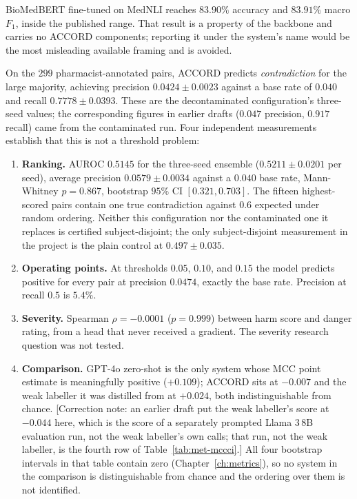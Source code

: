 BioMedBERT fine-tuned on MedNLI reaches $83.90\%$ accuracy and $83.91\%$ macro
$F_1$, inside the published range. That result is a property of the backbone and
carries no ACCORD components; reporting it under the system's name would be the
most misleading available framing and is avoided.

On the $299$ pharmacist-annotated pairs, ACCORD predicts \emph{contradiction} for
the large majority, achieving precision $0.0424 \pm 0.0023$ against a base rate
of $0.040$ and recall $0.7778 \pm 0.0393$. These are the decontaminated
configuration's three-seed values; the corresponding figures in earlier drafts
($0.047$ precision, $0.917$ recall) came from the contaminated run. Four
independent measurements establish that this is not a threshold problem:

\begin{enumerate}
\item \textbf{Ranking.} AUROC $0.5145$ for the three-seed ensemble
      ($0.5211 \pm 0.0201$ per seed), average precision $0.0579 \pm 0.0034$
      against a $0.040$ base rate, Mann-Whitney $p = 0.867$, bootstrap $95\%$ CI
      $[0.321, 0.703]$. The fifteen highest-scored pairs contain one true
      contradiction against $0.6$ expected under random ordering. Neither this
      configuration nor the contaminated one it replaces is certified
      subject-disjoint; the only subject-disjoint measurement in the project is
      the plain control at $0.497 \pm 0.035$.
\item \textbf{Operating points.} At thresholds $0.05$, $0.10$, and $0.15$ the
      model predicts positive for every pair at precision $0.0474$, exactly the
      base rate. Precision at recall $0.5$ is $5.4\%$.
\item \textbf{Severity.} Spearman $\rho = -0.0001$ ($p = 0.999$) between harm
      score and danger rating, from a head that never received a gradient. The
      severity research question was not tested.
\item \textbf{Comparison.} GPT-4o zero-shot is the only system whose MCC point
      estimate is meaningfully positive ($+0.109$); ACCORD sits at $-0.007$ and
      the weak labeller it was distilled from at $+0.024$, both indistinguishable
      from chance. [Correction note: an earlier draft put the weak labeller's
      score at $-0.044$ here, which is the score of a separately prompted Llama
      3\,8B evaluation run, not the weak labeller's own calls; that run, not the
      weak labeller, is the fourth row of Table~\ref{tab:met-mccci}.] All four
      bootstrap intervals in that table contain zero (Chapter~\ref{ch:metrics}),
      so no system in the comparison is distinguishable from chance and the
      ordering over them is not identified.
\end{enumerate}

